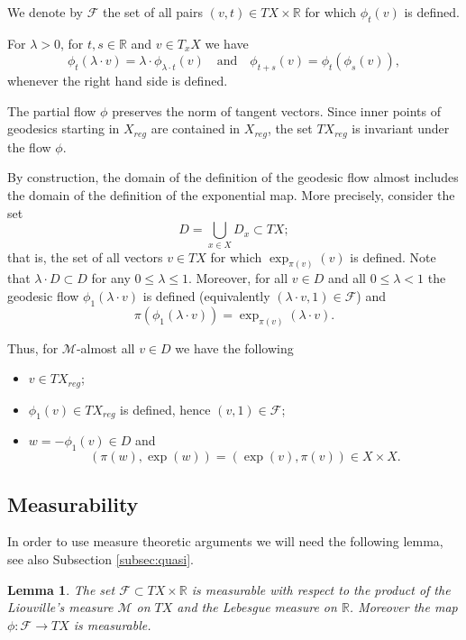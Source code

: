\documentclass[12pt,leqno,intlimits]{amsart}
\numberwithin{equation}{section}
\newtheorem{lem}[thm]{Lemma}
\theoremstyle{definition}
\theoremstyle{remark}
\newcommand{\R}{\mathbb{R}}
\def\:{\colon}
\begin{document}
We denote by $\mathcal F$ the set of all pairs  $(v,t)\in TX\times\R$  for which $\phi_t(v)$ is defined.


For $\lambda >0$, for $t,s\in \R$ and $v\in T_x X$ we have
$$\phi _t(\lambda \cdot v) =\lambda \cdot \phi _{\lambda \cdot t} (v)
\quad\text{and}\quad
\phi _{t+s} (v) =\phi _t ( \phi _s (v)),$$
whenever the right hand side is defined.

The partial flow $\phi$ preserves the norm of tangent vectors. Since inner points of geodesics starting in $X_{reg}$ are contained in $X_{reg}$, the set $TX_{reg}$ is invariant under the flow $\phi$.

By construction, the domain of the definition of the geodesic flow almost includes the domain of the definition of the exponential map.
More precisely, consider the set
\[D=\bigcup_{x\in X} D_x\subset TX;\]
that is, the set of all vectors $v\in TX$ for which $\exp _{\pi(v)} (v)$ is defined.
Note that $\lambda\cdot D\subset D$ for any $0\leq \lambda \leq 1$.
Moreover, for all $v\in D$ and all $0\leq \lambda <1$
the geodesic flow $\phi_1(\lambda\cdot v)$ is defined (equivalently $(\lambda\cdot v,1)\in \mathcal F$) and
\[\pi(\phi_1 (\lambda\cdot  v))= \exp _{\pi (v)} (\lambda\cdot  v).\]


Thus, for $\mathcal M$-almost all $v\in D$ we have the following
\begin{itemize}
\item $v\in TX_{reg}$;
\item $\phi _1(v) \in TX_{reg}$ is defined,  hence $(v,1)\in \mathcal F$;
\item $w=-\phi_1 (v)\in D$ and
\begin{equation} \label{eq:symm}
(\pi (w), \exp (w))=(\exp (v), \pi (v)) \in X\times X.
\end{equation}
\end{itemize}


\subsection{Measurability} \label{subsec:measur}
In order to use measure theoretic arguments we will need the following lemma, see also Subsection \ref{subsec:quasi}.
\begin{lem}\label{lem:measurability}
The set $\mathcal F\subset TX\times \R$ is measurable with respect to the product of the Liouville's measure $\mathcal M$ on $TX$ and the Lebesgue measure on $\R$.
Moreover the map $\phi \:\mathcal F \to TX$ is measurable.
\end{lem}
\end{document}

